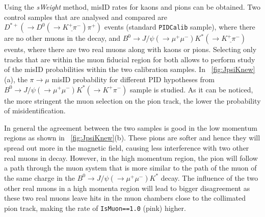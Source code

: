 Using the \textit{sWeight} method, misID rates for kaons and pions can be obtained. Two control samples that are analysed and compared are $D^{*+}(\rightarrow D^{0}(\rightarrow \underline{K^{+} \pi^{-}}) \pi^{+})$ events (standard \texttt{PIDCalib} sample), where there are no other muons in the decay, and $B^{0} \rightarrow J/\psi(\rightarrow \mu^{+} \mu^{-}) K^{*}(\rightarrow \underline{K^{+}\pi^{-}})$ events, where there are two real muons along with kaons or pions. Selecting only tracks that are within the muon fiducial region for both \DIFdelbegin {}\DIFdelend \DIFaddbegin {}\DIFaddend allows to perform study of the misID probabilities within the two calibration samples. In ~\autoref{fig:JpsiKnew}(a), the $\pi \rightarrow \mu$ misID probability for different \gls{PID} hypotheses from \DIFaddbegin {}\DIFaddend $B^{0} \rightarrow J/\psi(\rightarrow \mu^{+} \mu^{-}) K^{*}(\rightarrow K^{+}\pi^{-})$ sample is studied. As it can be noticed, the more stringent the muon selection on the pion track, the lower the probability of misidentification.

In general the agreement between the two samples is good in the low momentum regions as shown in ~\autoref{fig:JpsiKnew}(b). These pions are softer and hence they will spread out more in the magnetic field, causing less interference with two other real muons in decay. However, in the high momentum region, the pion will follow a path through the muon system that is more similar to the path of the muon of the same charge in the $B^{0} \rightarrow J/\psi(\rightarrow \mu^{+} \mu^{-}) K^{*}$ decay. The influence of the two other real muons in a high momenta \DIFdelbegin {}\DIFdelend region will lead to bigger disagreement as these two real muons leave hits in the muon chambers close to the collimated pion track, making the rate of \texttt{IsMuon==1.0} (pink) higher. 






